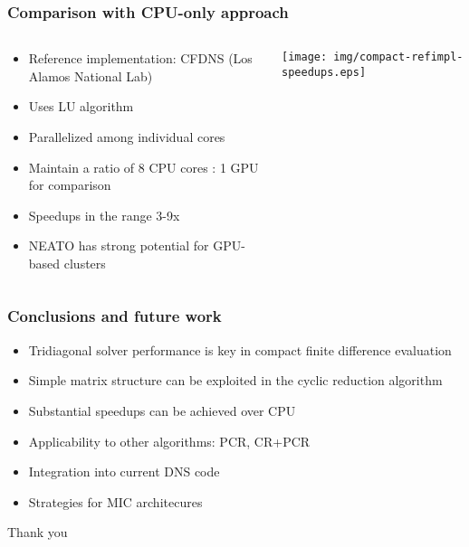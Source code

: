 \begin{frame}
\frametitle{Comparison with CPU-only approach}
\begin{columns}
\begin{column}{0.5\textwidth}
\begin{itemize}
\item Reference implementation: CFDNS
    (Los Alamos National Lab)
\item Uses LU algorithm
\item Parallelized among individual cores
\item Maintain a ratio of 8 CPU cores : 1 GPU for comparison
\item Speedups  in the range 3-9x
\item NEATO has strong potential for GPU-based clusters
\end{itemize}
\end{column}
\begin{column}{0.5\textwidth}
\centering
\begin{table}
\resizebox{0.75\textwidth}{!}{%

}
\end{table}

\texttt{[image: img/compact-refimpl-speedups.eps]}
\end{column}
\end{columns}
\end{frame}

\begin{frame}
\frametitle{Conclusions and future work}
\begin{itemize}
    \item Tridiagonal solver performance
        is key in compact finite difference evaluation
    \item Simple matrix structure can be exploited
        in the cyclic reduction algorithm
    \item Substantial speedups can be achieved
        over CPU
    \item Applicability to other algorithms: PCR, CR+PCR
    \item Integration into current DNS code
    \item Strategies for MIC architecures
\end{itemize}
\end{frame}

\begin{frame}
    Thank you    
\end{frame}

